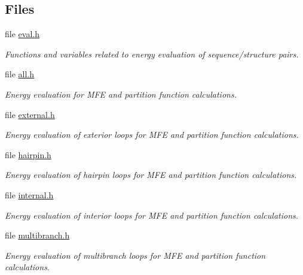 \subsection*{Files}
\begin{DoxyCompactItemize}
\item 
file \mbox{\hyperlink{eval_8h}{eval.\+h}}
\begin{DoxyCompactList}\small\item\em Functions and variables related to energy evaluation of sequence/structure pairs. \end{DoxyCompactList}\item 
file \mbox{\hyperlink{all_8h}{all.\+h}}
\begin{DoxyCompactList}\small\item\em Energy evaluation for M\+FE and partition function calculations. \end{DoxyCompactList}\item 
file \mbox{\hyperlink{external_8h}{external.\+h}}
\begin{DoxyCompactList}\small\item\em Energy evaluation of exterior loops for M\+FE and partition function calculations. \end{DoxyCompactList}\item 
file \mbox{\hyperlink{hairpin_8h}{hairpin.\+h}}
\begin{DoxyCompactList}\small\item\em Energy evaluation of hairpin loops for M\+FE and partition function calculations. \end{DoxyCompactList}\item 
file \mbox{\hyperlink{internal_8h}{internal.\+h}}
\begin{DoxyCompactList}\small\item\em Energy evaluation of interior loops for M\+FE and partition function calculations. \end{DoxyCompactList}\item 
file \mbox{\hyperlink{multibranch_8h}{multibranch.\+h}}
\begin{DoxyCompactList}\small\item\em Energy evaluation of multibranch loops for M\+FE and partition function calculations. \end{DoxyCompactList}\end{DoxyCompactItemize}
